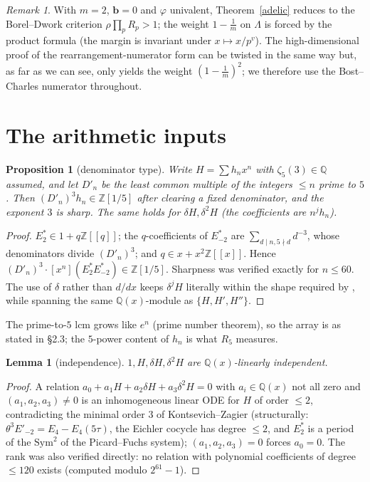 \documentclass[11pt]{amsart}
\newtheorem{lemma}[theorem]{Lemma}
\newtheorem{proposition}[theorem]{Proposition}
\theoremstyle{remark}
\newtheorem{remark}[theorem]{Remark}
\newcommand{\Q}{\mathbb Q}\newcommand{\Z}{\mathbb Z}\newcommand{\R}{\mathbb R}\newcommand{\C}{\mathbb C}
\begin{document}
\begin{remark} With $m=2$, $\mathbf b=0$ and $\varphi$ univalent, Theorem~\ref{adelic} reduces to the Borel--Dwork criterion $\rho\prod_pR_p>1$; the weight $1-\tfrac1m$ on $\Lambda$ is forced by the product formula (the margin is invariant under $x\mapsto x/p^v$). The high-dimensional proof of the rearrangement-numerator form \cite[Thm.~\emph{elementary form}]{CDTl2chi} can be twisted in the same way but, as far as we can see, only yields the weight $(1-\tfrac1m)^2$; we therefore use the Bost--Charles numerator throughout.\end{remark}

\section{The arithmetic inputs}
\begin{proposition}[denominator type]\label{tau}
Write $H=\sum h_nx^n$ with $\zeta_5(3)\in\Q$ assumed, and let $D'_n$ be the least common multiple of the integers $\le n$ prime to $5$. Then $(D'_n)^3h_n\in\Z[1/5]$ after clearing a fixed denominator, and the exponent $3$ is sharp. The same holds for $\delta H,\delta^2H$ (the coefficients are $n^jh_n$).
\end{proposition}
\begin{proof} $E_2^*\in1+q\Z[[q]]$; the $q$-coefficients of $E^*_{-2}$ are $\sum_{d\mid n,5\nmid d}d^{-3}$, whose denominators divide $(D'_n)^3$; and $q\in x+x^2\Z[[x]]$. Hence $(D'_n)^3\cdot[x^n](E_2^*E^*_{-2})\in\Z[1/5]$. Sharpness was verified exactly for $n\le60$. The use of $\delta$ rather than $d/dx$ keeps $\delta^jH$ literally within the shape required by \cite{CDTl2chi}, while spanning the same $\Q(x)$-module as $\{H,H',H''\}$.\end{proof}
The prime-to-$5$ lcm grows like $e^{n}$ (prime number theorem), so the array is as stated in \S2.3; the $5$-power content of $h_n$ is what $R_5$ measures.

\begin{lemma}[independence]\label{indep} $1,H,\delta H,\delta^2H$ are $\Q(x)$-linearly independent.\end{lemma}
\begin{proof} A relation $a_0+a_1H+a_2\delta H+a_3\delta^2H=0$ with $a_i\in\Q(x)$ not all zero and $(a_1,a_2,a_3)\ne0$ is an inhomogeneous linear ODE for $H$ of order $\le2$, contradicting the minimal order $3$ of Kontsevich--Zagier (structurally: $\theta^3E'_{-2}=E_4-E_4(5\tau)$, the Eichler cocycle has degree $\le2$, and $E_2^*$ is a period of the $\mathrm{Sym}^2$ of the Picard--Fuchs system); $(a_1,a_2,a_3)=0$ forces $a_0=0$. The rank was also verified directly: no relation with polynomial coefficients of degree $\le120$ exists (computed modulo $2^{61}-1$).\end{proof}
\end{document}
